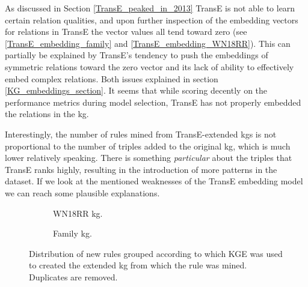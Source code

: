 As discussed in Section \ref{TransE_peaked_in_2013} TransE is not able to learn certain relation qualities, and upon further inspection of the embedding vectors for relations in TransE the vector values all tend toward zero (see \ref{TransE_embedding_family} and \ref{TransE_embedding_WN18RR}). This can partially be explained by TransE's tendency to push the embeddings of symmetric relations toward the zero vector and its lack of ability to effectively embed complex relations. Both issues explained in section \ref{KG_embeddings_section}. It seems that while scoring decently on the performance metrics during model selection, TransE has not properly embedded the relations in the \gls{kg}. 

Interestingly, the number of rules mined from TransE-extended \glspl{kg} is not proportional to the number of triples added to the original \gls{kg}, which is much lower relatively speaking. There is something \textit{particular} about the triples that TransE ranks highly, resulting in the introduction of more patterns in the dataset. If we look at the mentioned weaknesses of the TransE embedding model we can reach some plausible explanations.

\begin{figure}[htb]
\centering
\begin{subfigure}{.5\textwidth}
  \centering
  
  \caption{WN18RR \gls{kg}.}
  \label{venn_wn18rr}
\end{subfigure}%
\begin{subfigure}{.5\textwidth}
  \centering
  
  \caption{Family \gls{kg}.}
  \label{venn_family}
\end{subfigure}
\caption[New rules grouped by KGEs]{Distribution of new rules grouped according to which KGE was used to created the extended \gls{kg} from which the rule was mined. Duplicates are removed.}
\label{venn}
\end{figure}

